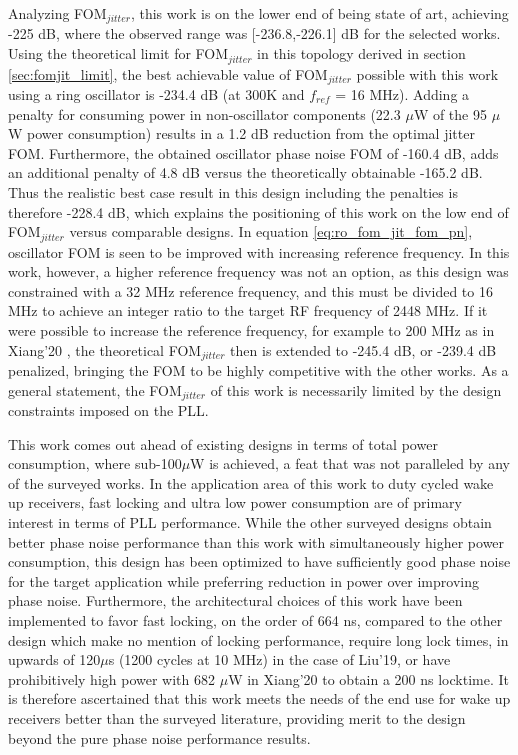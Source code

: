 Analyzing FOM$_{jitter}$, this work is on the lower end of being state of art, achieving -225 dB, where the observed range was [-236.8,-226.1] dB for the selected works. Using the theoretical limit for FOM$_{jitter}$ in this topology derived in section \ref{sec:fomjit_limit}, the best achievable value of FOM$_{jitter}$ possible with this work using a ring oscillator is -234.4 dB (at 300K and $f_{ref}$ = 16 MHz). Adding a penalty for consuming power in non-oscillator components (22.3 $\mu$W of the 95 $\mu$W power consumption) results in a 1.2 dB reduction from the optimal jitter FOM. Furthermore, the obtained oscillator phase noise FOM of -160.4 dB, adds an additional penalty of 4.8 dB versus the theoretically obtainable -165.2 dB. Thus the realistic best case result in this design including the penalties is therefore -228.4 dB, which explains the positioning of this work on the low end of FOM$_{jitter}$ versus comparable designs. In equation \ref{eq:ro_fom_jit_fom_pn}, oscillator FOM is seen to be improved with increasing reference frequency. In this work, however, a higher reference frequency was not an option, as this design was constrained with a 32 MHz reference frequency, and this must be divided to 16 MHz to achieve an integer ratio to the target RF frequency of 2448 MHz. If it were possible to increase the reference frequency, for example to 200 MHz as in Xiang'20 \cite{Xiang2020}, the theoretical FOM$_{jitter}$ then is extended to -245.4 dB, or -239.4 dB penalized, bringing the FOM to be highly competitive with the other works. As a general statement, the FOM$_{jitter}$ of this work is necessarily limited by the design constraints imposed on the PLL.

This work comes out ahead of existing designs in terms of total power consumption, where sub-100$\mu$W is achieved, a feat that was not paralleled by any of the surveyed works. In the application area of this work to duty cycled wake up receivers, fast locking and ultra low power consumption are of primary interest in terms of PLL performance. While the other surveyed designs obtain better phase noise performance than this work with simultaneously higher power consumption, this design has been optimized to have sufficiently good phase noise for the target application while preferring reduction in power over improving phase noise. Furthermore, the architectural choices of this work have been implemented to favor fast locking, on the order of 664 ns, compared to the other design which make no mention of locking performance, require long lock times, in upwards of 120$\mu$s (1200 cycles at 10 MHz) in the case of Liu'19, or have prohibitively high power with 682 $\mu$W in Xiang'20 to obtain a 200 ns locktime. It is therefore ascertained that this work meets the needs of the end use for wake up receivers better than the surveyed literature, providing merit to the design beyond the pure phase noise performance results.

